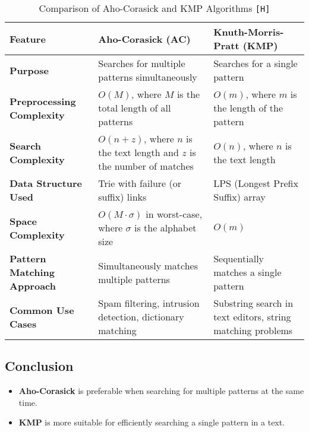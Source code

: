 \begin{table}[H]
    \centering
    \renewcommand{\arraystretch}{1.3}
    \begin{tabular}{|p{3cm}|p{5cm}|p{5cm}|}
        \hline
        \textbf{Feature} & \textbf{Aho-Corasick (AC)} & \textbf{Knuth-Morris-Pratt (KMP)} \\
        \hline
        \textbf{Purpose} & Searches for multiple patterns simultaneously & Searches for a single pattern \\
        \hline
        \textbf{Preprocessing Complexity} & \( O(M) \), where \( M \) is the total length of all patterns & \( O(m) \), where \( m \) is the length of the pattern \\
        \hline
        \textbf{Search Complexity} & \( O(n + z) \), where \( n \) is the text length and \( z \) is the number of matches & \( O(n) \), where \( n \) is the text length \\
        \hline
        \textbf{Data Structure Used} & Trie with failure (or suffix) links & LPS (Longest Prefix Suffix) array \\
        \hline
        \textbf{Space Complexity} & \( O(M \cdot \sigma) \) in worst-case, where \( \sigma \) is the alphabet size & \( O(m) \) \\
        \hline
        \textbf{Pattern Matching Approach} & Simultaneously matches multiple patterns & Sequentially matches a single pattern \\
        \hline
        \textbf{Common Use Cases} & Spam filtering, intrusion detection, dictionary matching & Substring search in text editors, string matching problems \\
        \hline
    \end{tabular}
    \caption{Comparison of Aho-Corasick and KMP Algorithms \texttt{[H]}}
    \label{tab:dissimilarities}
\end{table}

\subsection*{Conclusion}
\begin{itemize}
    \item \textbf{Aho-Corasick} is preferable when searching for multiple patterns at the same time.
    \item \textbf{KMP} is more suitable for efficiently searching a single pattern in a text.
\end{itemize}



